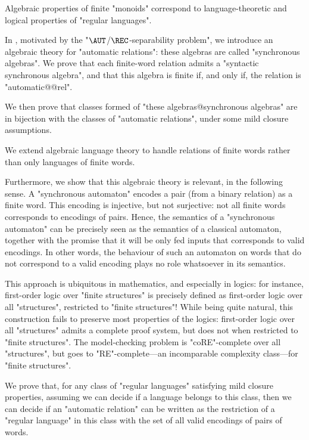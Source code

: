 \begin{known}
	Algebraic properties of finite "monoids" correspond to
	language-theoretic and logical properties of "regular languages".
\end{known}

In , motivated by the "$\AUT$/$\REC$-separability problem",
we introduce an algebraic theory for "automatic relations": these algebras are called
"synchronous algebras".
We prove that each finite-word relation admits a "syntactic synchronous algebra",
and that this algebra is finite if, and only if, the relation is "automatic@@rel".

We then prove that classes formed of "these algebras@synchronous algebras" 
are in bijection with the classes of "automatic relations", under some mild closure
assumptions. 

\begin{contribution}
	We extend algebraic language theory to handle relations of finite words
	rather than only languages of finite words.
\end{contribution}

Furthermore, we show that this algebraic theory is relevant, in the following sense.
A "synchronous automaton" encodes a pair (from a binary relation) as
a finite word. This encoding is injective, but not
surjective: not all finite words corresponds to encodings of pairs.
Hence, the semantics of a "synchronous automaton" can be precisely seen
as the semantics of a classical automaton, together with the promise that it will be only
fed inputs that corresponds to valid encodings. In other words,
the behaviour of such an automaton on words that do not correspond to a valid encoding
plays no role whatsoever in its semantics.

This approach is ubiquitous in mathematics, and especially in logics:
for instance, first-order logic over "finite structures" is precisely
defined as first-order logic over all "structures", restricted to "finite structures"!
While being quite natural, this construction fails to preserve most properties of the logics:
first-order logic over all "structures" admits a complete proof system,
but does not when restricted to "finite structures". The model-checking problem
is "coRE"-complete over all "structures", but goes to
"RE"-complete---an incomparable complexity class---for "finite structures".

\begin{contribution}
	We prove that, for any class of "regular languages" satisfying mild closure
	properties, assuming we can decide if a language belongs to this class,
	then we can decide if an "automatic relation" can be written as the restriction
	of a "regular language" in this class with the set of all valid encodings
	of pairs of words.
\end{contribution}


